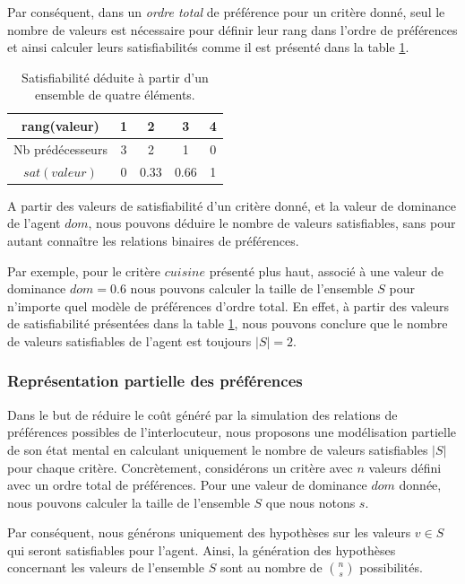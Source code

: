 	Par conséquent, dans un \emph{ordre total} de préférence pour un critère donné, seul le nombre de valeurs est nécessaire pour définir leur rang dans l'ordre de préférences et ainsi calculer leurs satisfiabilités comme il est présenté dans la table \ref{tab:poss}. 


	\begin{table}[h]
		\caption{Satisfiabilité déduite à partir d'un ensemble de quatre éléments.}
		\label{tab:poss}
		\centering
		
		\begin{tabular}{ |c|c|c|c|c| }
			\hline				
			rang(valeur) & 1 & 2 & 3 & 4 \\
			\hline
			Nb prédécesseurs & 3 & 2 & 1& 0 \\
			\hline
			$sat(valeur)$ & 0 & 0.33 & 0.66 &1 \\
			\hline
		\end{tabular}
	\end{table}
	
	A partir des valeurs de satisfiabilité d'un critère donné, et la valeur de dominance de l'agent $dom$, nous pouvons déduire le nombre de valeurs satisfiables, sans pour autant connaître les relations binaires de préférences. 
	
	Par exemple, pour le critère $cuisine$ présenté plus haut, associé à une valeur de dominance $dom= 0.6$
	nous pouvons calculer la taille de l'ensemble $S$ pour n'importe quel modèle de préférences d'ordre total. En effet, à partir des valeurs de satisfiabilité présentées dans la table \ref{tab:poss},  nous pouvons conclure que le nombre de valeurs satisfiables de l'agent est toujours $|S| = 2$.
	\subsubsection{Représentation partielle des préférences}
	Dans le but de réduire le coût généré par la simulation des relations de préférences possibles de l'interlocuteur, nous proposons une modélisation partielle de son état mental en calculant uniquement le nombre de valeurs satisfiables $|S|$ pour chaque critère. Concrètement, considérons un critère avec $n$ valeurs défini avec un ordre total de préférences. Pour une valeur de dominance $dom$ donnée, nous pouvons calculer la taille de l'ensemble $S$ que nous notons $s$. 
	
	Par conséquent, nous générons uniquement des hypothèses sur les valeurs $v \in S$ qui seront satisfiables pour l'agent. Ainsi,
	la génération des hypothèses concernant les valeurs de l'ensemble $S$ sont au nombre de  $\binom{n}{s}$ possibilités. 
	
